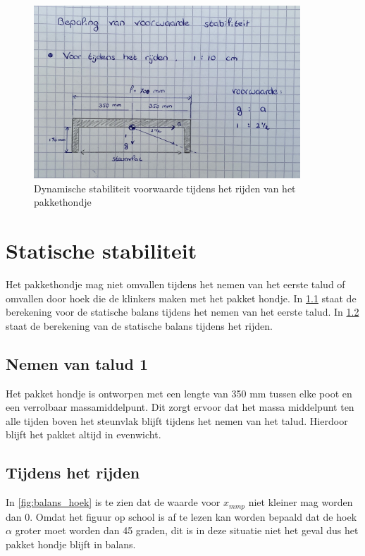 \begin{figure}[H]
    \centering
    \includegraphics[width = 100mm]{06_Bijlage_H/Dynamische stabiliteit/stabiliteit_rijden.jpg}
    \caption{Dynamische stabiliteit voorwaarde tijdens het rijden van het pakkethondje}
    \label{fig:voorwaarde_rijden}
\end{figure}


\section{Statische stabiliteit}
\label{se:Bijlage_H_Statische_stabiliteit}
Het pakkethondje mag niet omvallen tijdens het nemen van het eerste talud of omvallen door hoek die de klinkers maken met het pakket hondje. In \cref{se:sub_talud1_statisch} staat de berekening voor de statische balans tijdens het nemen van het eerste talud. In \cref{se:sub_rijden_statisch} staat de berekening van de statische balans tijdens het rijden.

\subsection{Nemen van talud 1}
\label{se:sub_talud1_statisch}

Het pakket hondje is ontworpen met een lengte van 350 mm tussen elke poot en een verrolbaar massamiddelpunt. Dit zorgt ervoor dat het massa middelpunt ten alle tijden boven het steunvlak blijft tijdens het nemen van het talud. Hierdoor blijft het pakket altijd in evenwicht.\\

\subsection{Tijdens het rijden}
\label{se:sub_rijden_statisch}
In \cref{fig:balans_hoek} is te zien dat de waarde voor $x_{mmp}$ niet kleiner mag worden dan 0. Omdat het figuur op school is af te lezen kan worden bepaald dat de hoek $\alpha$ groter moet worden dan 45 graden, dit is in deze situatie niet het geval dus het pakket hondje blijft in balans.\\

